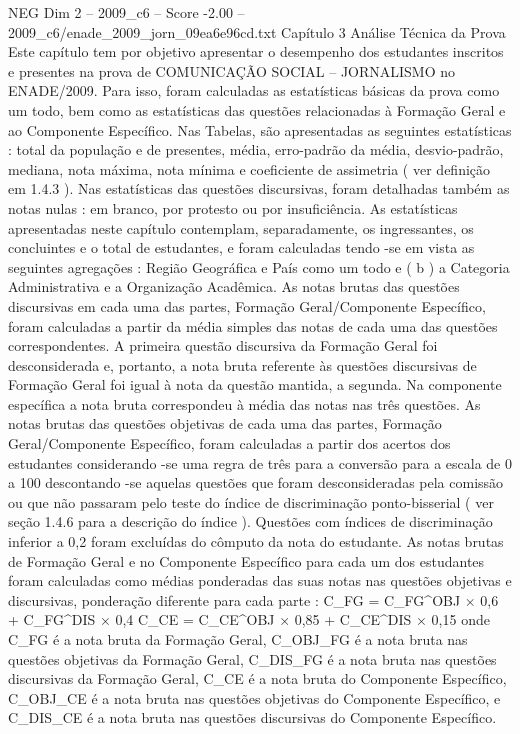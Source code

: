 \begin{textsample}{NEG Dim 2 – 2009\_c6 – Score -2.00 – 2009\_c6/enade\_2009\_jorn\_09ea6e96cd.txt}  \label{ex:f2_neg_138}
Capítulo 3 Análise Técnica da Prova Este capítulo tem por objetivo apresentar o desempenho dos estudantes inscritos e presentes na prova de COMUNICAÇÃO SOCIAL – JORNALISMO no ENADE/2009.
Para isso, foram calculadas as estatísticas básicas da prova como um todo, bem como as estatísticas das questões relacionadas à Formação Geral e ao Componente Específico.
Nas Tabelas, são apresentadas as seguintes estatísticas : total da população e de presentes, média, erro-padrão da média, desvio-padrão, mediana, nota máxima, nota mínima e coeficiente de assimetria ( ver definição em 1.4.3 ).
Nas estatísticas das questões discursivas, foram detalhadas também as notas nulas : em branco, por protesto ou por insuficiência.
As estatísticas apresentadas neste capítulo contemplam, separadamente, os ingressantes, os concluintes e o total de estudantes, e foram calculadas tendo -se em vista as seguintes agregações : Região Geográfica e País como um todo e ( b ) a Categoria Administrativa e a Organização Acadêmica.
As notas brutas das questões discursivas em cada uma das partes, Formação Geral/Componente Específico, foram calculadas a partir da média simples das notas de cada uma das questões correspondentes.
A primeira questão discursiva da Formação Geral foi desconsiderada e, portanto, a nota bruta referente às questões discursivas de Formação Geral foi igual à nota da questão mantida, a segunda.
Na componente específica a nota bruta correspondeu à média das notas nas três questões.
As notas brutas das questões objetivas de cada uma das partes, Formação Geral/Componente Específico, foram calculadas a partir dos acertos dos estudantes considerando -se uma regra de três para a conversão para a escala de 0 a 100 descontando -se aquelas questões que foram desconsideradas pela comissão ou que não passaram pelo teste do índice de discriminação ponto-bisserial ( ver seção 1.4.6 para a descrição do índice ).
Questões com índices de discriminação inferior a 0,2 foram excluídas do cômputo da nota do estudante.
As notas brutas de Formação Geral e no Componente Específico para cada um dos estudantes foram calculadas como médias ponderadas das suas notas nas questões objetivas e discursivas, ponderação diferente para cada parte : C\_FG = C\_FG\textasciicircum{}OBJ × 0,6 + C\_FG\textasciicircum{}DIS × 0,4 C\_CE = C\_CE\textasciicircum{}OBJ × 0,85 + C\_CE\textasciicircum{}DIS × 0,15 onde C\_FG é a nota bruta da Formação Geral, C\_OBJ\_FG é a nota bruta nas questões objetivas da Formação Geral, C\_DIS\_FG é a nota bruta nas questões discursivas da Formação Geral, C\_CE é a nota bruta do Componente Específico, C\_OBJ\_CE é a nota bruta nas questões objetivas do Componente Específico, e C\_DIS\_CE é a nota bruta nas questões discursivas do Componente Específico.

\end{textsample}
